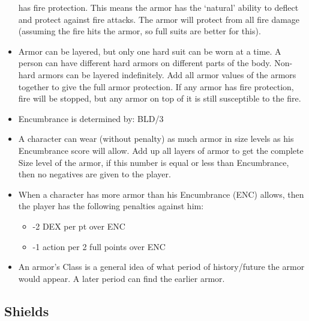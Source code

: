 \documentclass[twoside]{book}
\begin{document}
\begin{itemize}
                 has fire protection. This means the armor has the
                 `natural' ability to deflect and protect
                 against fire attacks. The armor will protect from all
                 fire damage (assuming the fire hits the armor, so full
                 suits are better for this). 
  \item   Armor can be layered, but only one hard suit can
                 be worn at a time. A person can have different hard
                 armors on different parts of the body. Non-hard armors
                 can be layered indefinitely. Add all armor values of the
                 armors together to give the full armor protection. If
                 any armor has fire protection, fire will be stopped, but
                 any armor on top of it is still susceptible to the fire.
                 
  \item   Encumbrance is determined by: BLD/3 
  \item   A character can wear (without penalty) as much
                 armor in size levels as his Encumbrance score will
                 allow. Add up all layers of armor to get the complete
                 Size level of the armor, if this number is equal or less
                 than Encumbrance, then no negatives are given to the
                 player. 
  \item   When a character has more armor than his
                Encumbrance (ENC) allows, then the player has the
                following penalties against him:
                
\begin{itemize}
      
  \item   -2 DEX per pt over ENC 
  \item   -1 action per 2 full points over ENC 
\end{itemize}
    
              
  \item   An armor's Class is a general idea of what
                 period of history/future the armor would appear. A later
                 period can find the earlier armor. 
\end{itemize}
  
    

\subsection{Shields}
    
\end{document}
